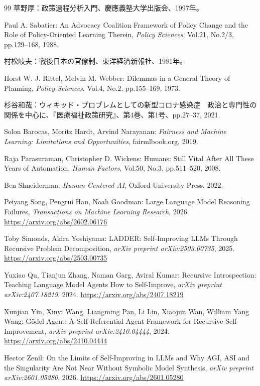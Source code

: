\documentclass{keikaku}
\begin{document}
\begin{thebibliography}{99}
    草野厚：政策過程分析入門、慶應義塾大学出版会、1997年。

    Paul A. Sabatier: An Advocacy Coalition Framework of Policy Change and the Role of Policy-Oriented Learning Therein, \textit{Policy Sciences}, Vol.21, No.2/3, pp.129--168, 1988.

    村松岐夫：戦後日本の官僚制、東洋経済新報社、1981年。

    Horst W. J. Rittel, Melvin M. Webber: Dilemmas in a General Theory of Planning, \textit{Policy Sciences}, Vol.4, No.2, pp.155--169, 1973.

    杉谷和哉：ウィキッド・プロブレムとしての新型コロナ感染症　政治と専門性の関係を中心に、『医療福祉政策研究』、第4巻、第1号、pp.27--37, 2021.

    Solon Barocas, Moritz Hardt, Arvind Narayanan: \textit{Fairness and Machine Learning: Limitations and Opportunities}, fairmlbook.org, 2019.

    Raja Parasuraman, Christopher D. Wickens: Humans: Still Vital After All These Years of Automation, \textit{Human Factors}, Vol.50, No.3, pp.511--520, 2008.

    Ben Shneiderman: \textit{Human-Centered AI}, Oxford University Press, 2022.

    Peiyang Song, Pengrui Han, Noah Goodman: Large Language Model Reasoning Failures, \textit{Transactions on Machine Learning Research}, 2026.
    \url{https://arxiv.org/abs/2602.06176}

    Toby Simonds, Akira Yoshiyama: LADDER: Self-Improving LLMs Through Recursive Problem Decomposition, \textit{arXiv preprint arXiv:2503.00735}, 2025.
    \url{https://arxiv.org/abs/2503.00735}

    Yuxiao Qu, Tianjun Zhang, Naman Garg, Aviral Kumar: Recursive Introspection: Teaching Language Model Agents How to Self-Improve, \textit{arXiv preprint arXiv:2407.18219}, 2024.
    \url{https://arxiv.org/abs/2407.18219}

    Xunjian Yin, Xinyi Wang, Liangming Pan, Li Lin, Xiaojun Wan, William Yang Wang: Gödel Agent: A Self-Referential Agent Framework for Recursive Self-Improvement, \textit{arXiv preprint arXiv:2410.04444}, 2024.
    \url{https://arxiv.org/abs/2410.04444}

    Hector Zenil: On the Limits of Self-Improving in LLMs and Why AGI, ASI and the Singularity Are Not Near Without Symbolic Model Synthesis, \textit{arXiv preprint arXiv:2601.05280}, 2026.
    \url{https://arxiv.org/abs/2601.05280}


\end{thebibliography}
\end{document}
